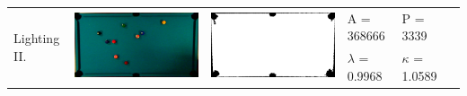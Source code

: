 \begin{tabular}{|l|c|c|l|l|c|}
\multirow{2}{*}{Lighting II.} & \multirow{2}{*}{\includegraphics[scale=0.05]{../images/1/8_img.png}} & \multirow{2}{*}{\includegraphics[scale=0.05]{../images/1/8_mask.png}} & A = 368666 & P = 3339 & \multirow{2}{*}{}\\ 
& & & $\lambda$ = 0.9968 & $\kappa$ = 1.0589 & \\
\hline


\end{tabular}
